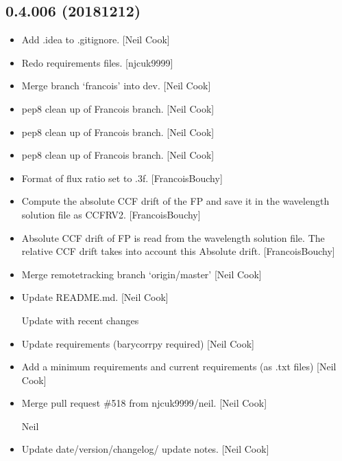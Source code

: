 \documentclass[a4paper,10pt,english]{report}
\begin{document}
\subsection{0.4.006 (2018\sphinxhyphen{}12\sphinxhyphen{}12)}
\label{\detokenize{misc/changelog:id257}}\begin{itemize}
\item {} 
Add .idea to .gitignore. {[}Neil Cook{]}

\item {} 
Re\sphinxhyphen{}do requirements files. {[}njcuk9999{]}

\item {} 
Merge branch ‘francois’ into dev. {[}Neil Cook{]}

\item {} 
 \sphinxhyphen{} pep8 clean up of Francois branch. {[}Neil
Cook{]}

\item {} 
 \sphinxhyphen{} pep8 clean up of Francois branch. {[}Neil
Cook{]}

\item {} 
 \sphinxhyphen{} pep8 clean up of Francois branch. {[}Neil
Cook{]}

\item {} 
Format of flux ratio set to .3f. {[}FrancoisBouchy{]}

\item {} 
Compute the absolute CCF drift of the FP and save it in the wavelength
solution file as CCFRV2. {[}FrancoisBouchy{]}

\item {} 
Absolute CCF drift of FP is read from the wavelength solution file.
The relative CCF drift takes into account this Absolute drift.
{[}FrancoisBouchy{]}

\item {} 
Merge remote\sphinxhyphen{}tracking branch ‘origin/master’ {[}Neil Cook{]}

\item {} 
Update README.md. {[}Neil Cook{]}

Update with recent changes

\item {} 
Update requirements (barycorrpy required) {[}Neil Cook{]}

\item {} 
Add a minimum requirements and current requirements (as .txt files)
{[}Neil Cook{]}

\item {} 
Merge pull request \#518 from njcuk9999/neil. {[}Neil Cook{]}

Neil

\item {} 
Update date/version/changelog/ update notes. {[}Neil Cook{]}

\end{itemize}
\end{document}
